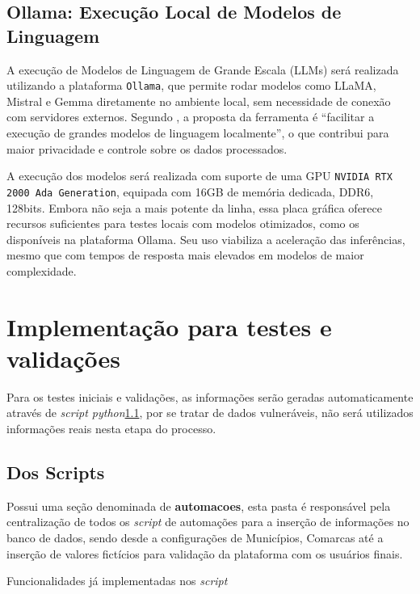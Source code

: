 \subsection{Ollama: Execução Local de Modelos de Linguagem}
\par A execução de Modelos de Linguagem de Grande Escala (LLMs) será realizada utilizando a plataforma \texttt{Ollama}, que permite rodar modelos como LLaMA, Mistral e Gemma diretamente no ambiente local, sem necessidade de conexão com servidores externos. Segundo , a proposta da ferramenta é “facilitar a execução de grandes modelos de linguagem localmente”, o que contribui para maior privacidade e controle sobre os dados processados.
\par A execução dos modelos será realizada com suporte de uma GPU \texttt{NVIDIA RTX 2000 Ada Generation}, equipada com 16GB de memória dedicada, DDR6, 128bits. Embora não seja a mais potente da linha, essa placa gráfica oferece recursos suficientes para testes locais com modelos otimizados, como os disponíveis na plataforma Ollama. Seu uso viabiliza a aceleração das inferências, mesmo que com tempos de resposta mais elevados em modelos de maior complexidade.


\section{Implementação para testes e validações}
\par Para os testes iniciais e validações, as informações serão geradas automaticamente através de \textit{script python}\ref{script}, por se tratar de dados vulneráveis, não será utilizados informações reais nesta etapa do processo.

\subsection{Dos Scripts}\label{script}
\par Possui uma seção denominada de \textbf{automacoes}, esta pasta é responsável pela centralização de todos os \textit{script} de automações para a inserção de informações no banco de dados, sendo desde a configurações de Municípios, Comarcas até a inserção de valores fictícios para validação da plataforma com os usuários finais.
\par Funcionalidades já implementadas nos \textit{script}

